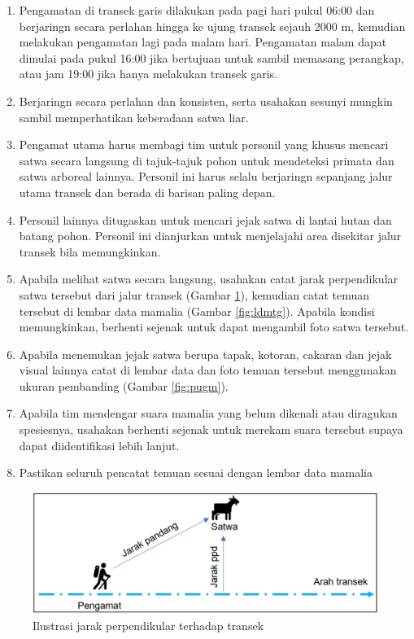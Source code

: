 \documentclass[
  oneside]{book}
\providecommand{\tightlist}{%
  \setlength{\itemsep}{0pt}\setlength{\parskip}{0pt}}
\begin{document}
\begin{enumerate}
\def\labelenumi{\arabic{enumi}.}
\tightlist
\item
  Pengamatan di transek garis dilakukan pada pagi hari pukul 06:00 dan berjaringn secara perlahan hingga ke ujung transek sejauh 2000 m, kemudian melakukan pengamatan lagi pada malam hari. Pengamatan malam dapat dimulai pada pukul 16:00 jika bertujuan untuk sambil memasang perangkap, atau jam 19:00 jika hanya melakukan transek garis.
\item
  Berjaringn secara perlahan dan konsisten, serta usahakan sesunyi mungkin sambil memperhatikan keberadaan satwa liar.
\item
  Pengamat utama harus membagi tim untuk personil yang khusus mencari satwa secara langsung di tajuk-tajuk pohon untuk mendeteksi primata dan satwa arboreal lainnya. Personil ini harus selalu berjaringn sepanjang jalur utama transek dan berada di barisan paling depan.
\item
  Personil lainnya ditugaskan untuk mencari jejak satwa di lantai hutan dan batang pohon. Personil ini dianjurkan untuk menjelajahi area disekitar jalur transek bila memungkinkan.
\item
  Apabila melihat satwa secara langsung, usahakan catat jarak perpendikular satwa tersebut dari jalur transek (Gambar \ref{fig:figppd}), kemudian catat temuan tersebut di lembar data mamalia (Gambar \ref{fig:ldmtg}). Apabila kondisi memungkinkan, berhenti sejenak untuk dapat mengambil foto satwa tersebut.
\item
  Apabila menemukan jejak satwa berupa tapak, kotoran, cakaran dan jejak visual lainnya catat di lembar data dan foto temuan tersebut menggunakan ukuran pembanding (Gambar \ref{fig:pugm}).
\item
  Apabila tim mendengar suara mamalia yang belum dikenali atau diragukan spesiesnya, usahakan berhenti sejenak untuk merekam suara tersebut supaya dapat diidentifikasi lebih lanjut.
\item
  Pastikan seluruh pencatat temuan sesuai dengan lembar data mamalia
\end{enumerate}

\begin{figure}

{\centering \includegraphics[width=1\linewidth]{images/ppd_ilustration} 

}

\caption{Ilustrasi jarak perpendikular terhadap transek}\label{fig:figppd}
\end{figure}
\end{document}
